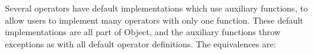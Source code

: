 Several operators have default implementations which use auxiliary functions, to allow users to implement many operators with only one function. These default implementations are all part of Object, and the auxiliary functions throw exceptions as with all default operator definitions. The equivalences are:



\begin{comment}
<table border="0" cellspacing="0" cellpadding="0" class="Table6"><colgroup><col width="384"/><col width="384"/></colgroup><tr><td style="text-align:left;width:3.4625in; " class="Table6_A1"><p class="P25">Operator

</td><td style="text-align:left;width:3.4625in; " class="Table6_B1"><p class="P25">Equivalence

</td></tr><tr><td style="text-align:left;width:3.4625in; " class="Table6_A2"><p class="P24">x &lt; y

</td><td style="text-align:left;width:3.4625in; " class="Table6_B2"><p class="P24">x.opCmp(y) &lt; 0

</td></tr><tr><td style="text-align:left;width:3.4625in; " class="Table6_A3"><p class="P24">x &lt;= y

</td><td style="text-align:left;width:3.4625in; " class="Table6_B3"><p class="P24">x.opCmp(y) &lt;= 0

</td></tr><tr><td style="text-align:left;width:3.4625in; " class="Table6_A3"><p class="P24">x &gt; y

</td><td style="text-align:left;width:3.4625in; " class="Table6_B3"><p class="P24">x.opCmp(y) &gt; 0

</td></tr><tr><td style="text-align:left;width:3.4625in; " class="Table6_A3"><p class="P24">x &gt;= y

</td><td style="text-align:left;width:3.4625in; " class="Table6_B3"><p class="P24">x.opCmp(y) &gt;= 0

</td></tr><tr><td style="text-align:left;width:3.4625in; " class="Table6_A3"><p class="P24">x as y

</td><td style="text-align:left;width:3.4625in; " class="Table6_B3"><p class="P24">Multiple steps:

<p class="P24">1) If x is derived from y (determined by

<p class="P24"><span class="T6">  </span>opIs), returns x.

<p class="P24">2) x.opCastTo(y)

<p class="P24">3) if opCastTo returned null,<br/>  y.opCastFrom(x)

<p class="P24">4) if opCastFrom returned null, null

</td></tr></table><p class="P5">
\end{comment}

